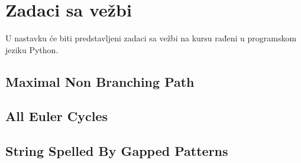 \section{Zadaci sa vežbi}
\setexamplecodestyle

U nastavku će biti predstavljeni zadaci sa vežbi na kursu rađeni u programskom jeziku Python.

\subsection{Maximal Non Branching Path}



\subsection{All Euler Cycles}



\subsection{String Spelled By Gapped Patterns}



\blankpage
